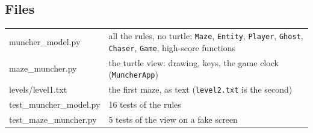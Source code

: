 \documentclass[level=3,teacher]{kidscode}
\begin{document}
\subsection{Files}
\begin{tabularx}{\linewidth}{@{}>{\ttfamily}p{4.6cm}X@{}}
muncher\_model.py & all the rules, no turtle: \texttt{Maze}, \texttt{Entity}, \texttt{Player},
\texttt{Ghost}, \texttt{Chaser}, \texttt{Game}, high-score functions\\
maze\_muncher.py & the turtle view: drawing, keys, the game clock (\texttt{MuncherApp})\\
levels/level1.txt & the first maze, as text (\texttt{level2.txt} is the second)\\
test\_muncher\_model.py & 16 tests of the rules\\
test\_maze\_muncher.py & 5 tests of the view on a fake screen\\
\end{tabularx}
\end{document}
